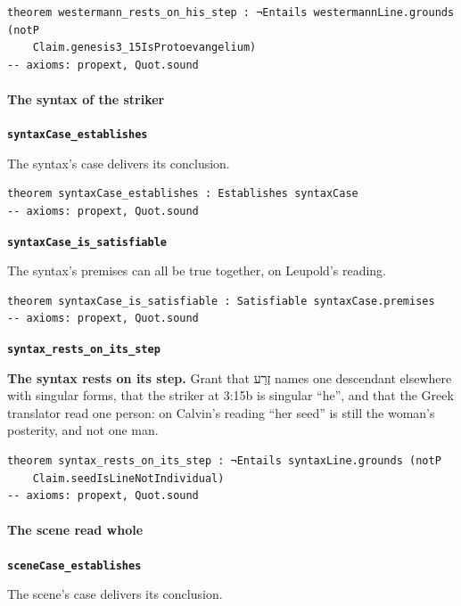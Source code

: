 \documentclass[11pt]{article}
\begin{document}
{\small\begin{verbatim}
theorem westermann_rests_on_his_step : ¬Entails westermannLine.grounds (notP
    Claim.genesis3_15IsProtoevangelium)
-- axioms: propext, Quot.sound
\end{verbatim}}
\paragraph*{The syntax of the striker}
\leavevmode\par\nobreak
\par\medskip\noindent\textbf{\texttt{syntax\allowbreak{}Case\_\allowbreak{}establishes}}\par\nobreak\noindent
The syntax’s case delivers its conclusion.

{\small\begin{verbatim}
theorem syntaxCase_establishes : Establishes syntaxCase
-- axioms: propext, Quot.sound
\end{verbatim}}
\par\medskip\noindent\textbf{\texttt{syntax\allowbreak{}Case\_\allowbreak{}is\_\allowbreak{}satisfiable}}\par\nobreak\noindent
The syntax’s premises can all be true together, on Leupold’s reading.

{\small\begin{verbatim}
theorem syntaxCase_is_satisfiable : Satisfiable syntaxCase.premises
-- axioms: propext, Quot.sound
\end{verbatim}}
\par\medskip\noindent\textbf{\texttt{syntax\_\allowbreak{}rests\_\allowbreak{}on\_\allowbreak{}its\_\allowbreak{}step}}\par\nobreak\noindent
\textbf{The syntax rests on its step.} Grant that זֶרַע names one descendant elsewhere with singular forms, that the striker at 3:15b is singular “he”, and that the Greek translator read one person: on Calvin’s reading “her seed” is still the woman’s posterity, and not one man.

{\small\begin{verbatim}
theorem syntax_rests_on_its_step : ¬Entails syntaxLine.grounds (notP
    Claim.seedIsLineNotIndividual)
-- axioms: propext, Quot.sound
\end{verbatim}}
\paragraph*{The scene read whole}
\leavevmode\par\nobreak
\par\medskip\noindent\textbf{\texttt{scene\allowbreak{}Case\_\allowbreak{}establishes}}\par\nobreak\noindent
The scene’s case delivers its conclusion.
\end{document}
